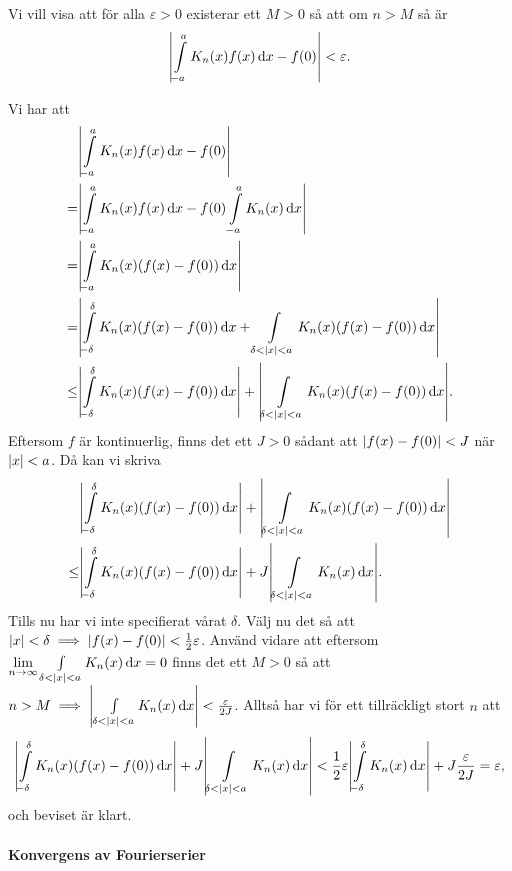 \proof
Vi vill visa att för alla $\varepsilon > 0$ existerar ett $M > 0$ så att om $n > M$ så är
\begin{align*}
	\abs{\int\limits_{-a}^{a}K_{n}(x)f(x)\dd{x} - f(0)} < \varepsilon.
\end{align*}

Vi har att
\begin{align*}
         &\abs{\int\limits_{-a}^{a}K_{n}(x)f(x)\dd{x} - f(0)} \\
	=    &\abs{\int\limits_{-a}^{a}K_{n}(x)f(x)\dd{x} - f(0)\int\limits_{-a}^{a}K_{n}(x)\dd{x}} \\
	=    & \abs{\int\limits_{-a}^{a}K_{n}(x)(f(x) - f(0))\dd{x}} \\
	=    & \abs{\int\limits_{-\delta}^{\delta}K_{n}(x)(f(x) - f(0))\dd{x} + \int\limits_{\delta < \abs{x} < a}^{}K_{n}(x)(f(x) - f(0))\dd{x}} \\
	\leq & \abs{\int\limits_{-\delta}^{\delta}K_{n}(x)(f(x) - f(0))\dd{x}} + \abs{\int\limits_{\delta < \abs{x} < a}^{}K_{n}(x)(f(x) - f(0))\dd{x}}.
\end{align*}
Eftersom $f$ är kontinuerlig, finns det ett $J > 0$ sådant att $\abs{f(x) - f(0)} < J$ när $\abs{x} < a$. Då kan vi skriva
\begin{align*}
	     &\abs{\int\limits_{-\delta}^{\delta}K_{n}(x)(f(x) - f(0))\dd{x}} + \abs{\int\limits_{\delta < \abs{x} < a}^{}K_{n}(x)(f(x) - f(0))\dd{x}} \\
	\leq & \abs{\int\limits_{-\delta}^{\delta}K_{n}(x)(f(x) - f(0))\dd{x}} + J\abs{\int\limits_{\delta < \abs{x} < a}^{}K_{n}(x)\dd{x}}.
\end{align*}
Tills nu har vi inte specifierat vårat $\delta$. Välj nu det så att $\abs{x} < \delta\implies\abs{f(x) - f(0)} < \frac{1}{2}\varepsilon$. Använd vidare att eftersom $\lim\limits_{n\to\infty}\int\limits_{\delta < \abs{x} < a}^{}K_{n}(x)\dd{x} = 0$ finns det ett $M > 0$ så att $n > M\implies \abs{\int\limits_{\delta < \abs{x} < a}^{}K_{n}(x)\dd{x}} < \frac{\varepsilon}{2J}$. Alltså har vi för ett tillräckligt stort $n$ att
\begin{align*}
	\abs{\int\limits_{-\delta}^{\delta}K_{n}(x)(f(x) - f(0))\dd{x}} + J\abs{\int\limits_{\delta < \abs{x} < a}^{}K_{n}(x)\dd{x}} < \frac{1}{2}\varepsilon\abs{\int\limits_{-\delta}^{\delta}K_{n}(x)\dd{x}} + J\frac{\varepsilon}{2J} = \varepsilon,
\end{align*}
och beviset är klart.

\paragraph{Konvergens av Fourierserier}

